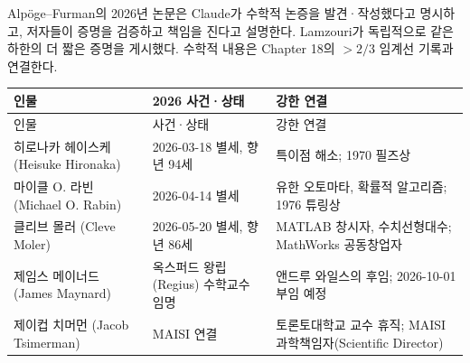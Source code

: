 \begin{fact}
Alpöge--Furman의 2026년 논문은 Claude가 수학적 논증을 발견·작성했다고 명시하고, 저자들이 증명을 검증하고 책임을 진다고 설명한다. Lamzouri가 독립적으로 같은 하한의 더 짧은 증명을 게시했다. 수학적 내용은 Chapter 18의 $>2/3$ 임계선 기록과 연결한다.
\end{fact}


\begin{center}
\small
\begin{longtable}{@{}L{0.26\textwidth}L{0.18\textwidth}L{0.48\textwidth}@{}}
\toprule
인물 & 2026 사건·상태 & 강한 연결\\
\midrule
\endfirsthead
\toprule 인물 & 사건·상태 & 강한 연결\\ \midrule \endhead
\bottomrule\endlastfoot
히로나카 헤이스케 (Heisuke Hironaka) & 2026-03-18 별세, 향년 94세 & 특이점 해소; 1970 필즈상\\
마이클 O. 라빈 (Michael O. Rabin) & 2026-04-14 별세 & 유한 오토마타, 확률적 알고리즘; 1976 튜링상\\
클리브 몰러 (Cleve Moler) & 2026-05-20 별세, 향년 86세 & MATLAB 창시자, 수치선형대수; MathWorks 공동창업자\\
제임스 메이너드 (James Maynard) & 옥스퍼드 왕립(Regius) 수학교수 임명 & 앤드루 와일스의 후임; 2026-10-01 부임 예정\\
제이컵 치머먼 (Jacob Tsimerman) & MAISI 연결 & 토론토대학교 교수 휴직; MAISI 과학책임자(Scientific Director)\\
\end{longtable}
\end{center}




